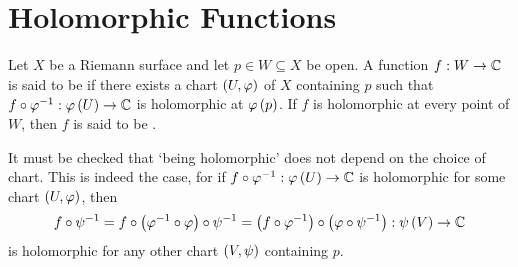 \documentclass[../Moduli_Spaces_of_Riemann_Surfaces.tex]{subfiles}
\begin{document}
    \section{Holomorphic Functions}
    \begin{definition}
        Let $X$ be a Riemann surface and let $p\in W\subseteq X$ be open. A function $f:W\to\mathbb{C}$ is said to be  if there exists a chart $\left(U,\varphi\right)$ of $X$ containing $p$ such that $f\circ\varphi^{-1}:\varphi\left(U\right)\to\mathbb{C}$ is holomorphic at $\varphi\left(p\right)$. If $f$ is holomorphic at every point of $W$, then $f$ is said to be .
    \end{definition}
    \begin{remark}
        It must be checked that $\textrm{`}$being holomorphic$\textrm{'}$ does not depend on the choice of chart. This is indeed the case, for if $f\circ\varphi^{-1}:\varphi\left(U\right)\to\mathbb{C}$ is holomorphic for some chart $\left(U,\varphi\right)$, then
        \begin{equation*}
            f\circ\psi^{-1}=f\circ\left(\varphi^{-1}\circ\varphi\right)\circ\psi^{-1}=\left(f\circ\varphi^{-1}\right)\circ\left(\varphi\circ\psi^{-1}\right):\psi\left(V\right)\to\mathbb{C}
        \end{equation*}
        is holomorphic for any other chart $\left(V,\psi\right)$ containing $p$.\exqed
    \end{remark}
\end{document}
